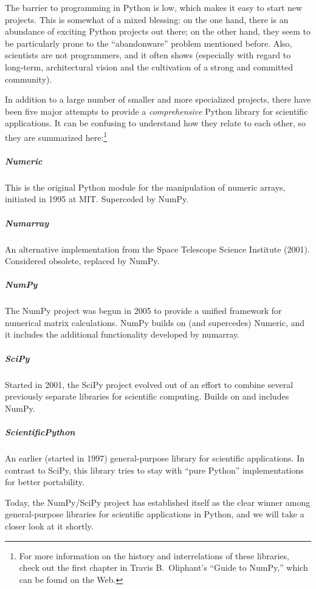 The barrier to programming in Python is low, which makes it easy to
start new projects. This is somewhat of a mixed blessing: on the one
hand, there is an abundance of exciting Python projects out there; on
the other hand, they seem to be particularly prone to the
``abandonware'' problem mentioned before. Also, scientists are not
programmers, and it often shows (especially with regard to long-term,
architectural vision and the cultivation of a strong and committed
community).

In addition to a large number of smaller and more specialized
projects, there have been five major attempts to provide a
\emph{comprehensive} Python library for scientific applications.  It
can be confusing to understand how they relate to each other, so they
are summarized here:\footnote{For more information on the history and
  interrelations of these libraries, check out the first chapter in
  Travis B.\ Oliphant's ``Guide to NumPy,'' which can be found on the
  Web.}

\begin{unnumlist}
\subparagraph{Numeric} 
\item This is the original Python module for the manipulation
  of numeric arrays, initiated in 1995 at MIT. Superceded by NumPy.  
\subparagraph{Numarray}
\item  An alternative implementation from the Space Telescope
  Science Institute (2001). Considered obsolete, replaced by NumPy.  
\subparagraph{NumPy}
\item The NumPy project was begun in 2005 to provide a unified   
  framework for numerical matrix calculations. NumPy builds on (and
  supercedes) Numeric, and it includes the additional functionality 
  developed by numarray.  
\subparagraph{SciPy}
\item Started in 2001, the SciPy project evolved out of an  
  effort to combine several previously separate libraries for 
  scientific computing. Builds on and includes NumPy.
\subparagraph{ScientificPython}
\item An earlier (started in 1997) general-purpose 
  library for scientific applications. In contrast to SciPy, this
  library tries to stay with ``pure Python'' implementations for
  better portability.
\end{unnumlist}

Today, the NumPy/SciPy project has established itself as the clear
winner among general-purpose libraries for scientific applications
in Python, and we will take a closer look at it shortly.

